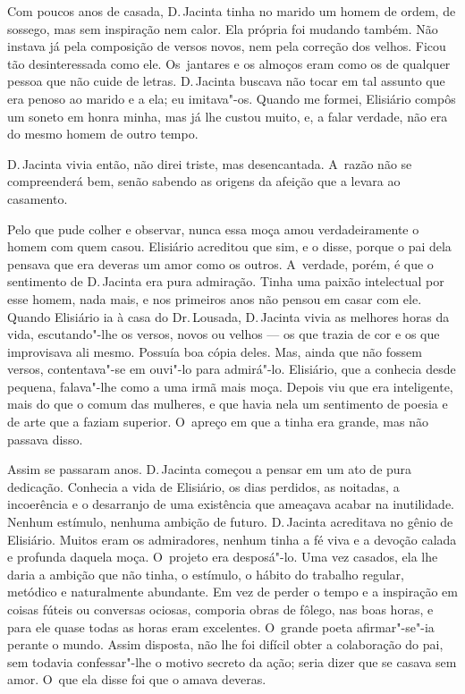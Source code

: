 \begin{linenumbers}
Com poucos anos de casada, D.\,Jacinta tinha no marido um homem de ordem,
de sossego, mas sem inspiração nem calor. Ela própria foi mudando
também. Não instava já pela composição de versos novos, nem pela
correção dos velhos. Ficou tão desinteressada como ele. Os~jantares e os
almoços eram como os de qualquer pessoa que não cuide de letras. D.\,Jacinta buscava não tocar em tal assunto que era penoso ao marido e a
ela; eu imitava"-os. Quando me formei, Elisiário compôs um soneto em
honra minha, mas já lhe custou muito, e, a falar verdade, não era do
mesmo homem de outro tempo.

D.\,Jacinta vivia então, não direi triste, mas desencantada. A~razão não
se compreenderá bem, senão sabendo as origens da afeição que a levara ao
casamento.

Pelo que pude colher e observar, nunca essa moça amou verdadeiramente o
homem com quem casou. Elisiário acreditou que sim, e o disse, porque o
pai dela pensava que era deveras um amor como os outros. A~verdade,
porém, é que o sentimento de D.\,Jacinta era pura admiração. Tinha uma
paixão intelectual por esse homem, nada mais, e nos primeiros anos não
pensou em casar com ele. Quando Elisiário ia à casa do Dr.\,Lousada, D.\,Jacinta vivia as melhores horas da vida, escutando"-lhe os versos, novos
ou velhos --- os que trazia de cor e os que improvisava ali mesmo.
Possuía boa cópia deles. Mas, ainda que não fossem versos, contentava"-se
em ouvi"-lo para admirá"-lo. Elisiário, que a conhecia desde pequena,
falava"-lhe como a uma irmã mais moça. Depois viu que era inteligente,
mais do que o comum das mulheres, e que havia nela um sentimento de
poesia e de arte que a faziam superior. O~apreço em que a tinha era
grande, mas não passava disso.

Assim se passaram anos. D.\,Jacinta começou a pensar em um ato de pura
dedicação. Conhecia a vida de Elisiário, os dias perdidos, as noitadas,
a incoerência e o desarranjo de uma existência que ameaçava acabar na
inutilidade. Nenhum estímulo, nenhuma ambição de futuro. D.\,Jacinta
acreditava no gênio de Elisiário. Muitos eram os admiradores, nenhum
tinha a fé viva e a devoção calada e profunda daquela moça. O~projeto
era desposá"-lo. Uma vez casados, ela lhe daria a ambição que não tinha,
o estímulo, o hábito do trabalho regular, metódico e naturalmente
abundante. Em vez de perder o tempo e a inspiração em coisas fúteis ou
conversas ociosas, comporia obras de fôlego, nas boas horas, e para ele
quase todas as horas eram excelentes. O~grande poeta afirmar"-se"-ia
perante o mundo. Assim disposta, não lhe foi difícil obter a colaboração
do pai, sem todavia confessar"-lhe o motivo secreto da ação; seria dizer
que se casava sem amor. O~que ela disse foi que o amava deveras.


\end{linenumbers}
